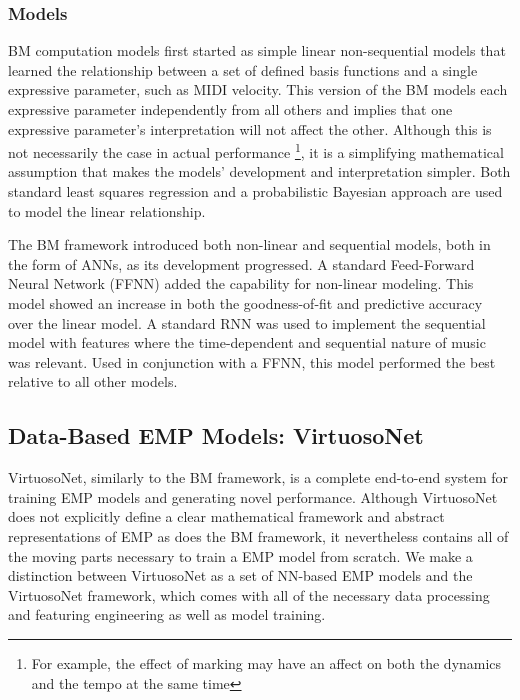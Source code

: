 \subsubsection{Models}
BM computation models first started as simple linear non-sequential models that learned the relationship between a set of defined basis functions and a single expressive parameter, such as MIDI velocity. This version of the BM models each expressive parameter independently from all others and implies that one expressive parameter's interpretation will not affect the other. Although this is not necessarily the case in actual performance \footnote{For example, the effect of  marking may have an affect on both the dynamics and the tempo at the same time}, it is a simplifying mathematical assumption that makes the models' development and interpretation simpler. Both standard least squares regression and a probabilistic Bayesian approach are used to model the linear relationship. 

The BM framework introduced both non-linear and sequential models, both in the form of ANNs, as its development progressed. A standard Feed-Forward Neural Network (FFNN) added the capability for non-linear modeling. This model showed an increase in both the goodness-of-fit and predictive accuracy over the linear model. A standard RNN was used to implement the sequential model with features where the time-dependent and sequential nature of music was relevant. Used in conjunction with a FFNN, this model performed the best relative to all other models.

\newcommand{\vnet}{VirtuosoNet}
\newcommand{\vnetf}{VirtuosoNet framework}

\subsection{Data-Based EMP Models: \vnet{}}
\vnet{}, similarly to the BM framework, is a complete end-to-end system for training EMP models and generating novel performance. Although \vnet{} does not explicitly define a clear mathematical framework and abstract representations of EMP as does the BM framework, it nevertheless contains all of the moving parts necessary to train a EMP model from scratch. We make a distinction between \vnet{} as a set of NN-based EMP models and the \vnetf, which comes with all of the necessary data processing and featuring engineering as well as model training. 

